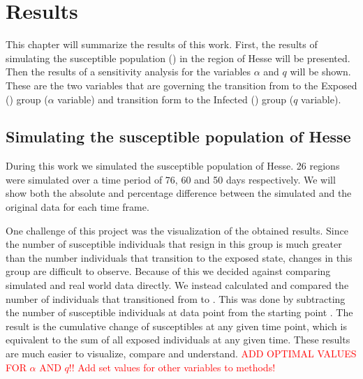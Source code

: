
\chapter{Results} %

\label{chap:results} 
This chapter will summarize the results of this work. First, the results of simulating the susceptible population ()
in the region of Hesse will be presented. Then the results of a sensitivity analysis for the variables $\alpha$ and
$q$ will be shown. These are the two variables that are governing the transition from  to
the Exposed () group ($\alpha$ variable) and transition form  to the Infected () group ($q$ variable).



\section{Simulating the susceptible population of Hesse}
\label{sec:sim_res}
During this work we simulated the susceptible population of Hesse. 26 regions were simulated over a time period of
76, 60 and 50 days respectively. We will show both the absolute and percentage difference between the simulated
and the original data for each time frame.\newline

One challenge of this project was the visualization of the obtained results. Since the number of susceptible
individuals that resign in this group is much greater than the number individuals that transition to the exposed state,
changes in this group are difficult to observe. Because of this we decided against comparing simulated and real world
 data directly. We instead  calculated and compared the number of individuals that
transitioned from  to . This was done by subtracting the number of susceptible individuals at data point  from
the starting point . The result is the cumulative change of susceptibles at any given time point, which is equivalent to the 
sum of all exposed individuals at any given time. These results are much easier to visualize, compare and understand.
\textcolor{red}{ADD OPTIMAL VALUES FOR $\alpha$ AND $q$!! Add set values for other variables to methods!}

